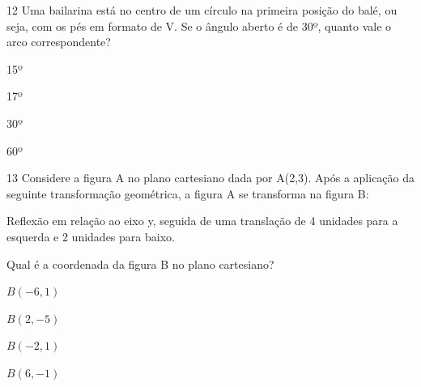 \num{12} Uma bailarina está no centro de um círculo na primeira posição do
balé, ou seja, com os pés em formato de V. Se o ângulo aberto é de 30º,
quanto vale o arco correspondente?

\begin{escolha}
\item 15º
\item 17º
\item 30º
\item 60º
\end{escolha}





\num{13} Considere a figura A no plano cartesiano dada por A(2,3). Após a
aplicação da seguinte transformação geométrica, a figura A se transforma
na figura B:

Reflexão em relação ao eixo y, seguida de uma translação de 4 unidades
para a esquerda e 2 unidades para baixo.

Qual é a coordenada da figura B no plano cartesiano?

\begin{escolha}
\item $B(-6,1)$
\item $B(2,-5)$
\item $B(-2,1)$
\item $B(6,-1)$
\end{escolha}



